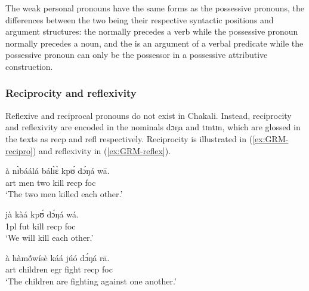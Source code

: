 \begin{exe}
\begin{exe}
\begin{exe}
\begin{exe}
\begin{exe}
\begin{exe}
\begin{exe}
\begin{exe}
\begin{exe}
The  weak personal pronouns have the same forms  as the possessive pronouns, the differences between the two being their respective syntactic positions and  argument structures:  the  normally precedes a verb while the possessive pronoun normally precedes a noun, and the  is an
argument of a verbal predicate while the possessive pronoun can only be the
possessor in a possessive attributive construction. 


% 
% 
% 


\subsubsection{Reciprocity and reflexivity}
\label{sec:GRM-recipro-reflex}


Reflexive and reciprocal pronouns do not exist in Chakali.  Instead, reciprocity and reflexivity  are encoded in  the nominals {\sls dɔŋa}   and {\sls tɪntɪn}, which are glossed in the texts as {\sc recp}  and {\sc refl} respectively.   Reciprocity is illustrated in (\ref{ex:GRM-recipro}) and reflexivity in (\ref{ex:GRM-reflex}). 

  \ea\label{ex:GRM-recipro}
   
   
\ea\label{ex:vp24.1.}
\gll à nɪ̀báálá bálɪ̀ɛ̀ kpʊ́ dɔ́ŋá wā.\\
  {\sc art} men two kill {\sc recp}  {\sc foc}\\
\glt  `The two men killed {\sc each other}.' 

\ex\label{ex:vp24.2.}
\gll jà kàá kpʊ́ dɔ́ŋá wá.\\
   {\sc 1pl} {\sc fut} kill  {\sc recp}   {\sc foc}\\
\glt  `We will kill {\sc each other}.' 

\ex\label{ex:vp24.3.}
\gll à hàmṍwísè káá júó dɔ́ŋá rā.\\
  {\sc art} children {\sc  egr} fight {\sc recp}  {\sc foc}\\
\glt  `The children are fighting against {\sc one another}.' 
 
   
  \z 
 \z




\end{exe}
\end{exe}
\end{exe}
\end{exe}
\end{exe}
\end{exe}
\end{exe}
\end{exe}
\end{exe}
